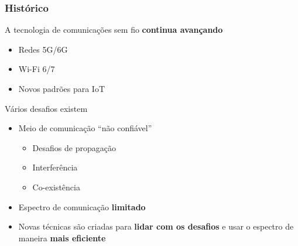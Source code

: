 \documentclass[10pt,xcolor=table]{beamer}
\begin{document}
\begin{frame}
\frametitle{Histórico}
    \begin{block}{A tecnologia de comunicações sem fio \textbf{continua avançando}}
		\begin{itemize}
            \item Redes 5G/6G
            \vspace{1mm}
            \item Wi-Fi 6/7
            \vspace{1mm}
            \item Novos padrões para IoT
		\end{itemize}
	\end{block}
    \begin{alertblock}{Vários desafios existem}
		\begin{itemize}
			\item Meio de comunicação ``não confiável''
            \begin{itemize}
                \item Desafios de propagação
                \vspace{1mm}
                \item Interferência
                \vspace{1mm}
                \item Co-existência
            \end{itemize}
            \item Espectro de comunicação \textbf{limitado}
            \vspace{2mm}
            \item Novas técnicas são criadas para \textbf{lidar com os desafios} e usar o espectro de maneira \textbf{mais eficiente}
		\end{itemize}
	\end{alertblock}
\end{frame}
\end{document}
